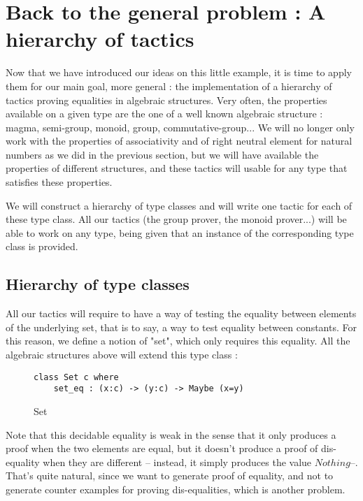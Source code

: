 \section {Back to the general problem : A hierarchy of tactics}

Now that we have introduced our ideas on this little example, it is time to apply them for our main goal, more general : the implementation of a hierarchy of tactics proving equalities in algebraic structures. Very often, the properties available on a given type are the one of a well known algebraic structure : magma, semi-group, monoid, group, commutative-group...  We will no longer only work with the properties of associativity and of right neutral element for natural numbers as we did in the previous section, but we will have available the properties of different structures, and these tactics will usable for any type that satisfies these properties.

We will construct a hierarchy of type classes and will write one tactic for each of these type class. All our tactics (the group prover, the monoid prover...) will be able to work on any type, being given that an instance of the corresponding type class is provided.

\subsection {Hierarchy of type classes}

All our tactics will require to have a way of testing the equality between elements of the underlying set, that is to say, a way to test equality between constants. For this reason, we define a notion of "set", which only requires this equality. All the algebraic structures above will extend this type class :

\begin{figure}[H]
\figrule
\begin{center}
\begin{verbatim}
class Set c where
    set_eq : (x:c) -> (y:c) -> Maybe (x=y)
\end{verbatim}
\end{center}
\caption{Set}
\figrule
\end{figure}

Note that this decidable equality is weak in the sense that it only produces a proof when the two elements are equal, but it doesn't produce a proof of dis-equality when they are different -- instead, it simply produces the value $Nothing$--. That's quite natural, since we want to generate proof of equality, and not to generate counter examples for proving dis-equalities, which is another problem.

